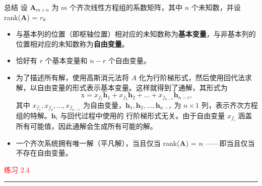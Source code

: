 \begin{bluebox}{总结}
设 \(\mathbf{A}_{m \times n}\) 为 \(m\) 个齐次线性方程组的系数矩阵，其中 \(n\) 个未知数，并设 rank(\(\mathbf{A}\)) = \(r\)。
\begin{itemize}
    \item 与基本列的位置（即枢轴位置）相对应的未知数称为\textbf{基本变量}，与非基本列的位置相对应的未知数称为\textbf{自由变量}。
    \item 恰好有 \(r\) 个基本变量和 \(n-r\) 个自由变量。
    \item 为了描述所有解，使用高斯消元法将 \(A\) 化为行阶梯形式，然后使用回代法求解，以自由变量的形式表示基本变量。这样就得到了通解，其形式为
    \[
    \mathrm{x} = x_{f_1}\mathbf{h}_1 + x_{f_2}\mathbf{h}_2 + ... + x_{f_{n-r}}\mathbf{h}_{n-r},
    \]
    其中 \(x_{f_1}, x_{f_2}, ..., x_{f_{n-r}}\) 为自由变量，\(\mathbf{h}_1, \mathbf{h}_2, ..., \mathbf{h}_{n-r}\) 为 \(n \times 1\) 列，表示齐次方程组的特解。\(\mathbf{h}_i\) 与回代过程中使用的
    行阶梯形式无关。由于自由变量 \(x_{f_i}\) 涵盖所有可能值，因此通解会生成所有可能的解。
    \item 一个齐次系统拥有唯一解（平凡解），当且仅当 rank(\(\mathbf{A}\)) = \(n\) ——即当且仅当不存在自由变量。
\end{itemize}
\end{bluebox}


\textcolor{red}{练习 2.4}
\color{red}\rule{\textwidth}{0.4pt}\color{black}

